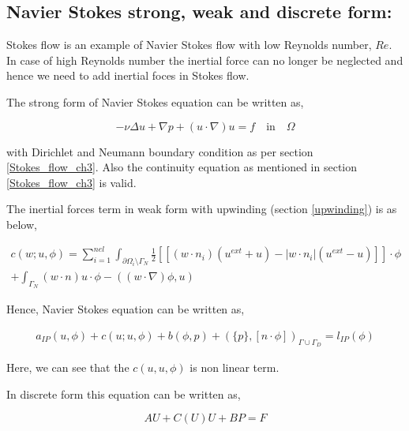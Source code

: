 \documentclass[a4paper,12pt]{book}
\begin{document}
\subsection{Navier Stokes strong, weak and discrete form:} \label{n_s_ch3}

Stokes flow is an example of Navier Stokes flow with low Reynolds number, $Re$. In case of high Reynolds number the inertial force can no longer be neglected and hence we need to add inertial foces in Stokes flow. 

The strong form of Navier Stokes equation can be written as,

\begin{equation} \label{navier_stokes_strong_ch3}
-\nu \Delta u + \nabla p + (u \cdot \nabla) u = f \quad \textrm{in} \quad \Omega
\end{equation}

with Dirichlet and Neumann boundary condition as per section \ref{Stokes_flow_ch3}. Also the continuity equation as mentioned in section \ref{Stokes_flow_ch3} is valid.

The inertial forces term in weak form with upwinding (section \ref{upwinding}) is as below,

\begin{equation}
\begin{split}
c(w;u,\phi) = \sum_{i=1}^{nel} \int_{\partial \Omega_i \setminus \Gamma_N} \frac{1}{2} [[(w \cdot n_i)(u^{ext} + u) - |w \cdot n_i|(u^{ext} - u)]] \cdot \phi \\ + \int_{\Gamma_N} (w\cdot n) u \cdot \phi -((w\cdot \nabla)\phi,u)
\end{split}
\end{equation}

Hence, Navier Stokes equation can be written as,

\begin{equation}\label{navier_stokes_weak_ch3}
\begin{split}
a_{IP}(u,\phi) + c(u;u,\phi) + b(\phi,p) + (\{p\},[n\cdot \phi])_{\Gamma \cup \Gamma_D} = l_{IP}(\phi) 
\end{split}
\end{equation}

Here, we can see that the $c(u,u,\phi)$ is non linear term.

In discrete form this equation can be written as,

\begin{equation}
AU + C(U) U + BP = F
\end{equation} 
\end{document}
